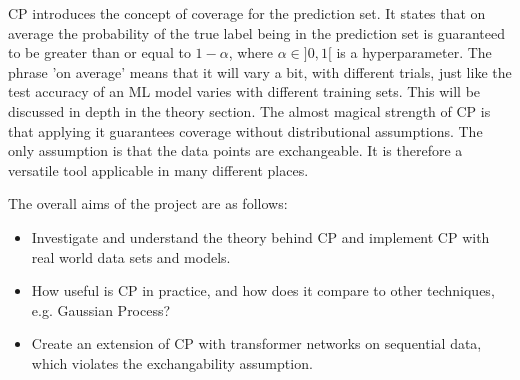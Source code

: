 %
CP introduces the concept of coverage for the prediction set. It states that on average the probability of the true label being in the prediction set is guaranteed to be greater than or equal to $1-\alpha$, where $\alpha\in]0,1[$ is a hyperparameter. The phrase 'on average' means that it will vary a bit, with different trials, just like the test accuracy of an ML model varies with different training sets. This will be discussed in depth in the theory section.
%
The almost magical strength of CP is that applying it guarantees coverage without distributional assumptions. The only assumption is that the data points are exchangeable. It is therefore a versatile tool applicable in many different places.

The overall aims of the project are as follows:
\begin{itemize}
    \item Investigate and understand the theory behind CP and implement CP with real world data sets and models.
    \item How useful is CP in practice, and how does it compare to other techniques, e.g. Gaussian Process?
    \item Create an extension of CP with transformer networks on sequential data, which violates the exchangability assumption.
\end{itemize}

